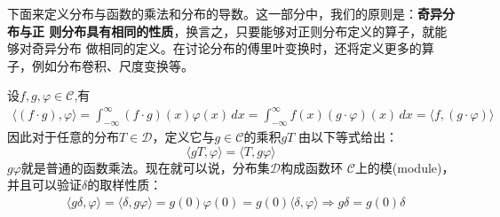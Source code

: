 \documentclass{ctexbook}
\begin{document}
下面来定义分布与函数的乘法和分布的导数。这一部分中，我们的原则是：\textbf{奇异分布与正
    则分布具有相同的性质}，换言之，只要能够对正则分布定义的算子，就能够对奇异分布
做相同的定义。在讨论分布的傅里叶变换时，还将定义更多的算子，例如分布卷积、尺度变换等。

设$f,g,\varphi\in\mathcal{C} $,有
\begin{align*}
    \langle (f\cdot g),\varphi\rangle=\int_{-\infty}^{\infty}(f\cdot g)(x)\varphi(x)\,dx=\int_{-\infty}^{\infty}f(x)(g\cdot\varphi)(x)\,dx=\langle f,(g\cdot\varphi)\rangle
\end{align*}
因此对于任意的分布$T\in\mathcal{D} $，定义它与$g\in\mathcal{C} $的乘积$gT$
由以下等式给出：
\begin{equation}
    \langle gT,\varphi\rangle=\langle T,g\varphi\rangle
\end{equation}
$g\varphi$就是普通的函数乘法。现在就可以说，分布集$\mathcal{D} $构成函数环
$\mathcal{C} $上的模(module)，并且可以验证$\delta$的取样性质：
\begin{align*}
     & \langle g\delta,\varphi\rangle=\langle \delta,g\varphi\rangle=g(0)\varphi(0)=g(0)\langle\delta,\varphi\rangle \Rightarrow  g\delta=g(0)\delta
\end{align*}
\end{document}
